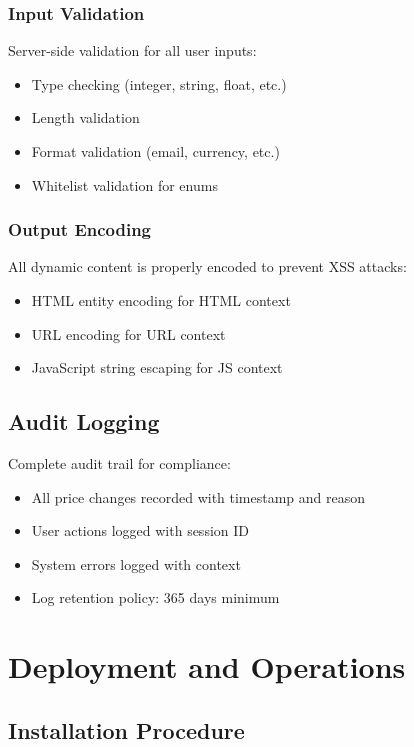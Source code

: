 \documentclass[12pt,a4paper,oneside]{report}
\begin{document}
\subsection{Input Validation}

Server-side validation for all user inputs:
\begin{itemize}
    \item Type checking (integer, string, float, etc.)
    \item Length validation
    \item Format validation (email, currency, etc.)
    \item Whitelist validation for enums
\end{itemize}

\subsection{Output Encoding}

All dynamic content is properly encoded to prevent XSS attacks:
\begin{itemize}
    \item HTML entity encoding for HTML context
    \item URL encoding for URL context
    \item JavaScript string escaping for JS context
\end{itemize}

\section{Audit Logging}

Complete audit trail for compliance:

\begin{itemize}
    \item All price changes recorded with timestamp and reason
    \item User actions logged with session ID
    \item System errors logged with context
    \item Log retention policy: 365 days minimum
\end{itemize}

\newpage

\chapter{Deployment and Operations}

\section{Installation Procedure}
\end{document}

